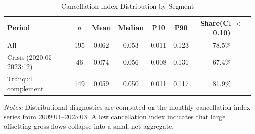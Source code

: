 \begin{table}[htbp]
\centering
\scriptsize
\caption{Cancellation-Index Distribution by Segment}
\label{tab:cancellation_distribution}
\begin{tabular}{lcccccc}
\toprule
Period & $n$ & Mean & Median & P10 & P90 & Share(CI $<$ 0.10) \\
\midrule
All & 195 & 0.062 & 0.053 & 0.011 & 0.123 & 78.5\% \\
Crisis (2020:03--2023:12) & 46 & 0.074 & 0.056 & 0.008 & 0.131 & 67.4\% \\
Tranquil complement & 149 & 0.059 & 0.050 & 0.011 & 0.117 & 81.9\% \\
\bottomrule
\end{tabular}
\begin{tablenotes}
\footnotesize
\item \textit{Notes:} Distributional diagnostics are computed on the monthly cancellation-index series from 2009:01--2025:03. A low cancellation index indicates that large offsetting gross flows collapse into a small net aggregate.
\end{tablenotes}
\end{table}
